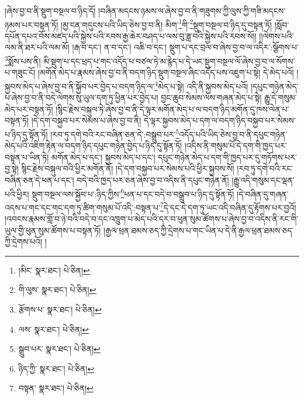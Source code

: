 །ཞེས་བྱ་བ་ནི་སྡུག་བསྔལ་བ་ཉིད་དོ། །བཞིན་མདངས་ཉམས་ལ་ཞེས་བྱ་བ་ནི་གཟུགས་ཀྱི་ལུས་ཀྱི་གཟི་མདངས་ཉམས་པར་བསྟན་ཏོ། །མྱ་ངན་གདུངས་པའི་ཡིད་ཅེས་བྱ་བ་ནི། མིག་\footnote{།མིང་  སྣར་ཐང་།  པེ་ཅིན། }གི་\footnote{གི་ལུས་  སྣར་ཐང་།  པེ་ཅིན། }སྡུག་བསྔལ་བ་ཉིད་དུ་བསྟན་ཏོ། །སློབ་དཔོན་དཔའ་བོས་མཛད་པའི་སྐྱེས་པའི་རབས་རྒྱ་ཆེར་བཤད་པ་ལས་བུ་ཟླ་བའི་སྐྱེས་པའི་རབས་སོ།། །།ལེགས་པའི་ལམ་ནི་ཐར་པའི་ལམ་མོ། །རྒ་བ་དང་། ན་བ་དང་། འཆི་བ་དང་། སྡུག་པ་དང་བྲལ་བ་ཞེས་བྱ་བ་ལ་འདིར་:སྩོགས་པ་\footnote{རྩོགས་པ་  སྣར་ཐང་།  པེ་ཅིན། }སྨོས་པས་ནི། མི་སྡུག་པ་དང་ཕྲད་པ་གང་འདོད་པ་བཙལ་ཏེ་མ་རྙེད་པ་དེ་ཡང་སྡུག་བསྔལ་ལོ་ཞེས་བྱ་བ་ལ་སོགས་པ་གཟུང་ངོ། །མགོན་མེད་པ་རྣམས་ཞེས་བྱ་བ་ནི་བདག་ཉིད་སྡུག་བསྔལ་ཞིང་འདོད་པས་འཇུག་པ་སྟེ། དེ་མེད་པའོ། །སྐྱབས་མེད་པ་ཞེས་བྱ་བ་ནི་སྐྱོབ་པར་བྱེད་པ་བདག་ཉིད་ལ་\footnote{ལས་  སྣར་ཐང་།  པེ་ཅིན། }མེད་པ་སྟེ། འདི་ནི་སྐྱབས་མེད་པའོ། །དཔུང་གཉེན་མེད་པ་ཞེས་བྱ་བ་ནི་བདེ་ལེགས་སུ་ཡུལ་དག་ཏུ་ཕྱིན་པར་བྱེད་པ། བྱང་ཆུབ་སེམས་ལས་གཞན་མེད་པ་སྟེ། རྒྱུ་དེ་གསུམ་མེད་པར་བསྟན་ཏོ། །སྙིང་རྗེས་བསྐུལ་ཏེ་ཞེས་བྱ་བ་ནི་དེ་ལྟར་མགོན་མེད་པ་ལ་བདག་ཉིད་མགོན་དུ་ཁས་ལེན་པ་བསྟན་ཏོ། །དེ་དག་བསྐྱབ་པར་སེམས་པ་ཞེས་བྱ་བ་ནི། དེ་ལྟར་སྐྱབས་མེད་པ་དག་ལ་བདག་ཉིད་བསྐྱབ་པར་སེམས་པ་ཉིད་དུ་སྟོན་ཏོ། །རབ་ཏུ་དགེ་བའི་རང་བཞིན་ཅན་དེ་:བསྒྲུབ་པར་\footnote{སྒྲུབ་པར་  སྣར་ཐང་།  པེ་ཅིན། }འདོད་པའི་ཡིད་ཅེས་བྱ་བ་ནི་དཔུང་གཉེན་མེད་པའི་འཇིག་རྟེན་ལ་བདག་ཉིད་དཔུང་གཉེན་བྱེད་པ་ཉིད་དུ་སྟོན་ཏོ། །འདིས་ནི་གསུམ་པོ་དེ་དག་གི་ཁྱད་པར་བསྟན་པ་ཡིན་ཏེ། མགོན་མེད་པ་དང་། སྐྱབས་མེད་པ་དང་། དཔུང་གཉེན་མེད་པ་དག་གི་ཁྱད་པར་དུ་གཏོགས་པར་བྱ་སྟེ། སྙིང་རྗེས་བསྐུལ་བའི་ཕྱིར་མགོན་ནོ། །དེ་དག་བསྐྱབ་པར་སེམས་པའི་ཕྱིར་སྐྱབས་སོ། །རབ་ཏུ་དགེ་བའི་རང་བཞིན་ཅན་དེ་ཕན་པ་དང་། བདེ་བའི་ཁྱད་པར་ཅན་ཞེས་བྱ་བ་འདིས་ནི་དཔུང་གཉེན་ནོ། །རྒྱུ་འདི་གསུམ་དང་ལྡན་པའི་ཕྱིར། སྡུག་བསྔལ་ལས་སྐྱོབ་པ་:ཉིད་ཀྱིས་\footnote{ཉིད་ཀྱི་  སྣར་ཐང་།  པེ་ཅིན། }ཕན་པ་དང་བདེ་བ་བསྒྲུབ་པ་ཉིད་དུ་སྟོན་ཏོ། །དེ་བཞིན་དུ་གཞན་འདས་པ་གང་དང་གང་དག་ཏུ་ཚིག་གསུམ་པོ་འདི་:བསྟན་པ་\footnote{བསྟན་  སྣར་ཐང་།  པེ་ཅིན། }དེ་དང་དེ་དག་ཏུ་ཡང་འདི་བཞིན་དུ་རྟོགས་པར་བྱའོ། །འབངས་རྣམས་གློ་བ་ཉེ་བའི་བདེ་བ་དང་འཁྲུག་པ་མེད་པའི་དར་བ་ཕུན་སུམ་ཚོགས་པ་ཞེས་བྱ་བ་འདིས་ནི་རང་གི་ཡུལ་གྱི་ཕུན་སུམ་ཚོགས་པ་བསྟན་ཏོ། །རྒྱལ་ཕྲན་ཐམས་ཅད་ཀྱི་དྲེགས་པ་གང་ཡིན་པ་དེ་ནི་རྒྱལ་ཕྲན་ཐམས་ཅད་ཀྱི་དྲེགས་པའོ། །
